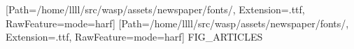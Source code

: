 \documentclass{article}
\date{\today}
\begin{document}
\maketitle

\begin{multicols}{3}
\setmainfont{NoticiaText-Regular}[Path=/home/llll/src/wasp/assets/newspaper/fonts/, Extension=.ttf, RawFeature={mode=harf}]
\newfontfamily{}[Path=/home/llll/src/wasp/assets/newspaper/fonts/, Extension=.ttf, RawFeature={mode=harf}]
FIG_ARTICLES
\end{multicols}
\end{document}
